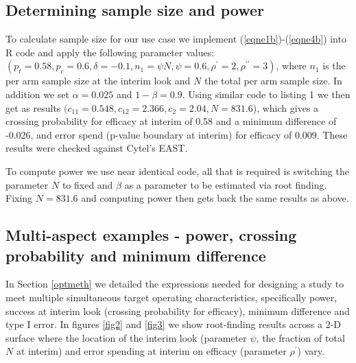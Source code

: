 \documentclass{article}
\begin{document}
\subsection{Determining sample size and power}
To calculate sample size for our use case we implement (\ref{eqne1b})-(\ref{eqne4b}) into R code and apply the following parameter values: $(p_t=0.58, p_c=0.6, \delta=-0.1,n_1=\psi N, \psi=0.6,\rho^{\prime}=2, \rho^{\prime\prime}=3)$, where $n_1$ is the per arm sample size at the interim look and $N$ the total per arm sample size. In addition we set $\alpha=0.025$ and $1-\beta=0.9$. Using similar code to listing 1 we then get as results $(c_{11}=0.548,c_{12}=2.366,c_2=2.04,N=831.6$), which gives a crossing probability for efficacy at interim of 0.58 and a minimum difference of -0.026, and error spend (p-value boundary at interim) for efficacy of 0.009. These results were checked against Cytel's EAST. 

To compute power we use near identical code, all that is required is switching the parameter $N$ to fixed and $\beta$ as a parameter to be estimated via root finding. Fixing $N=831.6$ and computing power then gets back the same results as above.   


\subsection{Multi-aspect examples - power, crossing probability and minimum difference}
In Section \ref{optmeth} we detailed the expressions needed for designing a study to meet multiple simultaneous target operating characteristics, specifically power, success at interim look (crossing probability for efficacy), minimum  difference and type I error. In figures \ref{fig2} and \ref{fig3} we show root-finding results across a 2-D surface where the location of the interim look (parameter $\psi$, the fraction of total $N$ at interim) and error spending at interim on efficacy (parameter $\rho^{\prime}$) vary.  
\end{document}
